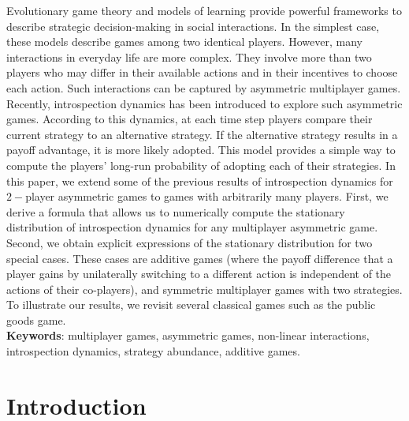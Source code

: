 \documentclass[11pt]{article}
\theoremstyle{plainCl1}
\theoremstyle{plainCl2}
\begin{document}
Evolutionary game theory and models of learning provide powerful frameworks to describe strategic decision-making in social interactions. 
In the simplest case, these models describe games among two identical players. 
However, many interactions in everyday life are more complex. 
They involve more than two players who may differ in their available actions and in their incentives to choose each action. 
Such interactions can be captured by asymmetric multiplayer games. 
Recently, introspection dynamics has been introduced to explore such asymmetric games. 
According to this dynamics, at each time step players compare their current strategy to an alternative strategy. 
If the alternative strategy results in a payoff advantage, it is more likely adopted. 
This model provides a simple way to compute the players’ long-run probability of adopting each of their strategies. 
In this paper, we extend some of the previous results of introspection dynamics for $2-$player asymmetric games to games with arbitrarily many players. 
First, we derive a formula that allows us to numerically compute the stationary distribution of introspection dynamics for any multiplayer asymmetric game. 
Second, we obtain explicit expressions of the stationary distribution for two special cases. These cases are additive games (where the payoff difference that a player gains by unilaterally switching to a different action is independent of the actions of their co-players), and symmetric multiplayer games with two strategies. 
To illustrate our results, we revisit several classical games such as the public goods game.\\


\noindent \textbf{Keywords}: multiplayer games, asymmetric games, non-linear interactions, introspection dynamics, strategy abundance, additive games.


\newpage

\section{Introduction}

\end{document}
